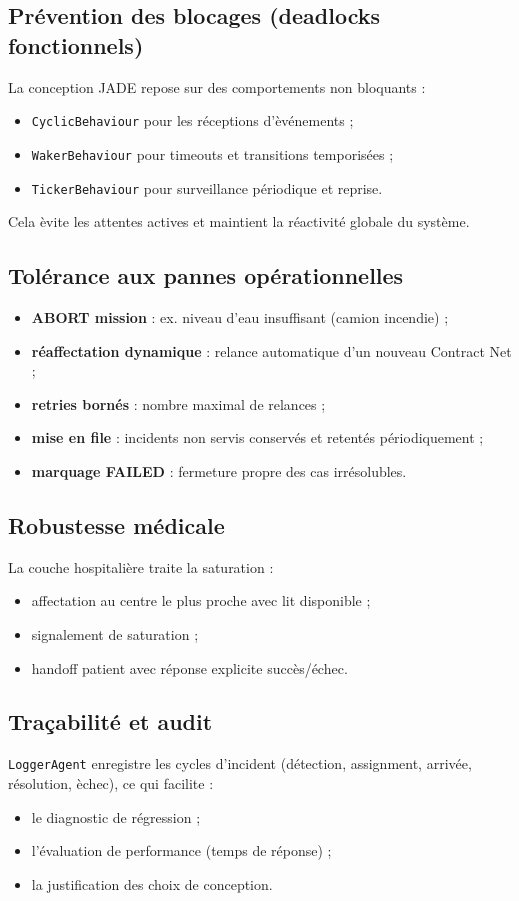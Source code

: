 \documentclass[12pt,a4paper]{article}
\begin{document}
\subsection{Pr\'evention des blocages (deadlocks fonctionnels)}
La conception JADE repose sur des comportements non bloquants :
\begin{itemize}
    \item \texttt{CyclicBehaviour} pour les r\'eceptions d'\`ev\'enements ;
    \item \texttt{WakerBehaviour} pour timeouts et transitions temporis\'ees ;
    \item \texttt{TickerBehaviour} pour surveillance p\'eriodique et reprise.
\end{itemize}

Cela \`evite les attentes actives et maintient la r\'eactivit\'e globale du syst\`eme.

\subsection{Tol\'erance aux pannes op\'erationnelles}
\begin{itemize}
    \item \textbf{ABORT mission} : ex. niveau d'eau insuffisant (camion incendie) ;
    \item \textbf{r\'eaffectation dynamique} : relance automatique d'un nouveau Contract Net ;
    \item \textbf{retries born\'es} : nombre maximal de relances ;
    \item \textbf{mise en file} : incidents non servis conserv\'es et retent\'es p\'eriodiquement ;
    \item \textbf{marquage FAILED} : fermeture propre des cas irr\'esolubles.
\end{itemize}

\subsection{Robustesse m\'edicale}
La couche hospitali\`ere traite la saturation :
\begin{itemize}
    \item affectation au centre le plus proche avec lit disponible ;
    \item signalement de saturation ;
    \item handoff patient avec r\'eponse explicite succ\`es/\'echec.
\end{itemize}

\subsection{Tra\c{c}abilit\'e et audit}
\texttt{LoggerAgent} enregistre les cycles d'incident (d\'etection, assignment, arriv\'ee, r\'esolution, \`echec), ce qui facilite :
\begin{itemize}
    \item le diagnostic de r\'egression ;
    \item l'\'evaluation de performance (temps de r\'eponse) ;
    \item la justification des choix de conception.
\end{itemize}
\end{document}
